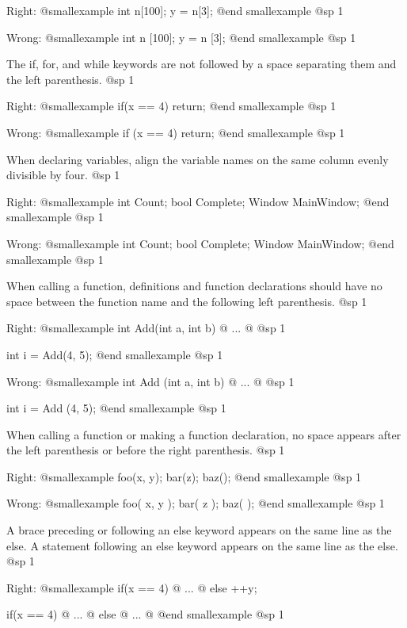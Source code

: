 Right:
@smallexample
int n[100];
y = n[3];
@end smallexample
@sp 1

Wrong:
@smallexample
int n [100];
y = n [3];
@end smallexample
@sp 1

\item
The if, for, and while keywords are not followed by a space separating them and the left parenthesis. 
@sp 1

Right:
@smallexample
if(x == 4)
    return;
@end smallexample
@sp 1

Wrong:
@smallexample
if (x == 4)
    return;
@end smallexample
@sp 1

\item
When declaring variables, align the variable names on the same column evenly divisible by four.
@sp 1

Right:
@smallexample
int     Count;
bool    Complete;
Window  MainWindow;
@end smallexample
@sp 1

Wrong:
@smallexample
int Count;
bool Complete;
Window MainWindow;
@end smallexample
@sp 1

\item
When calling a function, definitions and function declarations should have no space between the function name and the following left parenthesis.
@sp 1

Right:
@smallexample
int Add(int a, int b)
@{ 
    ... 
@}
@sp 1

int i = Add(4, 5);
@end smallexample
@sp 1

Wrong:
@smallexample
int Add (int a, int b)
@{
    ...
@}
@sp 1

int i = Add (4, 5);
@end smallexample
@sp 1

\item
When calling a function or making a function declaration, no space appears after the left parenthesis or before the right parenthesis.
@sp 1

Right:
@smallexample
foo(x, y);
bar(z);
baz();
@end smallexample
@sp 1

Wrong:
@smallexample
foo( x, y );
bar( z );
baz( );
@end smallexample
@sp 1

\item
A brace preceding or following an else keyword appears on the same line as the else. A statement following an else keyword appears on the same line as the else. 
@sp 1

Right:
@smallexample
if(x == 4)
@{
    ...
@}
else
  ++y;

if(x == 4)
@{
    ...
@}
else
@{
    ...
@}
@end smallexample
@sp 1

